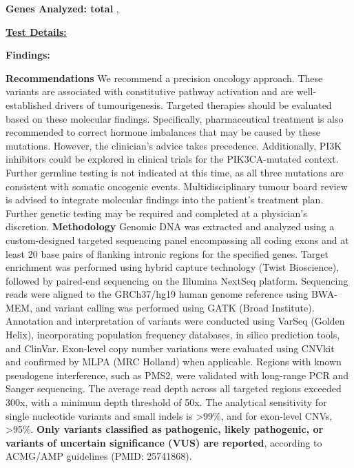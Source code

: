 \documentclass[11pt]{extarticle}
\newcommand{\data}[1]{}
\newenvironment{dataiter}[1]{}{}
\begin{document}
\vspace{3em}

{\bf \large Genes Analyzed: {\tiny \data{num_tested_genes} total}} \begin{dataiter}{tested_genes}\data{gene_symbol}, \end{dataiter}
\newpage

{\huge \bf \underline{Test Details:}} \newline
\newline

{\Large \bf Findings: }\newline
\data{plugin:long_blurb} \newline
\newline


{\Large \bf Recommendations \newline}
We recommend a precision oncology approach. These variants are associated with constitutive pathway activation and are well-established drivers of tumourigenesis. Targeted therapies should be evaluated based on these molecular findings. Specifically, pharmaceutical treatment is also recommended to correct hormone imbalances that may be caused by these mutations. However, the clinician's advice takes precedence. Additionally, PI3K inhibitors could be explored in clinical trials for the PIK3CA-mutated context. Further germline testing is not indicated at this time, as all three mutations are consistent with somatic oncogenic events. Multidisciplinary tumour board review is advised to integrate molecular findings into the patient's treatment plan. Further genetic testing may be required and completed at a physician's discretion. 
\newline 
\newline
{\Large \bf Methodology} \newline
Genomic DNA was extracted and analyzed using a custom-designed targeted sequencing panel encompassing all coding exons and at least 20 base pairs of flanking intronic regions for the specified genes. Target enrichment was performed using hybrid capture technology (Twist Bioscience), followed by paired-end sequencing on the Illumina NextSeq platform. Sequencing reads were aligned to the GRCh37/hg19 human genome reference using BWA-MEM, and variant calling was performed using GATK (Broad Institute). Annotation and interpretation of variants were conducted using VarSeq (Golden Helix), incorporating population frequency databases, in silico prediction tools, and ClinVar. Exon-level copy number variations were evaluated using CNVkit and confirmed by MLPA (MRC Holland) when applicable. Regions with known pseudogene interference, such as PMS2, were validated with long-range PCR and Sanger sequencing. The average read depth across all targeted regions exceeded 300x, with a minimum depth threshold of 50x. The analytical sensitivity for single nucleotide variants and small indels is >99\%, and for exon-level CNVs, >95\%. {\bf Only variants classified as pathogenic, likely pathogenic, or variants of uncertain significance (VUS) are reported}, according to ACMG/AMP guidelines (PMID: 25741868).
\end{document}
